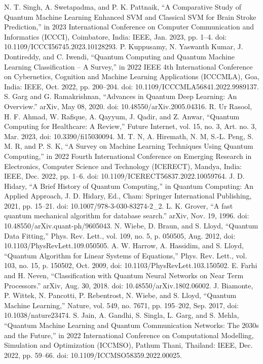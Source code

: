 \documentclass[conference]{IEEEtran}
\begin{document}
\begin{thebibliography}{00}
 N. T. Singh, A. Swetapadma, and P. K. Pattnaik, “A Comparative Study of Quantum Machine Learning Enhanced SVM and Classical SVM for Brain Stroke Prediction,” in 2023 International Conference on Computer Communication and Informatics (ICCCI), Coimbatore, India: IEEE, Jan. 2023, pp. 1–4. doi: 10.1109/ICCCI56745.2023.10128293.
 P. Kuppusamy, N. Yaswanth Kumar, J. Dontireddy, and C. Iwendi, “Quantum Computing and Quantum Machine Learning Classification – A Survey,” in 2022 IEEE 4th International Conference on Cybernetics, Cognition and Machine Learning Applications (ICCCMLA), Goa, India: IEEE, Oct. 2022, pp. 200–204. doi: 10.1109/ICCCMLA56841.2022.9989137.
 S. Garg and G. Ramakrishnan, “Advances in Quantum Deep Learning: An Overview.” arXiv, May 08, 2020. doi: 10.48550/arXiv.2005.04316.
 R. Ur Rasool, H. F. Ahmad, W. Rafique, A. Qayyum, J. Qadir, and Z. Anwar, “Quantum Computing for Healthcare: A Review,” Future Internet, vol. 15, no. 3, Art. no. 3, Mar. 2023, doi: 10.3390/fi15030094.
 M. T. N, A. Hiremath, N. M, S.-L. Peng, S. M. R, and P. S. K, “A Survey on Machine Learning Techniques Using Quantum Computing,” in 2022 Fourth International Conference on Emerging Research in Electronics, Computer Science and Technology (ICERECT), Mandya, India: IEEE, Dec. 2022, pp. 1–6. doi: 10.1109/ICERECT56837.2022.10059764.
 J. D. Hidary, “A Brief History of Quantum Computing,” in Quantum Computing: An Applied Approach, J. D. Hidary, Ed., Cham: Springer International Publishing, 2021, pp. 15–21. doi: 10.1007/978-3-030-83274-2\_2.
 L. K. Grover, “A fast quantum mechanical algorithm for database search.” arXiv, Nov. 19, 1996. doi: 10.48550/arXiv.quant-ph/9605043.
 N. Wiebe, D. Braun, and S. Lloyd, “Quantum Data Fitting,” Phys. Rev. Lett., vol. 109, no. 5, p. 050505, Aug. 2012, doi: 10.1103/PhysRevLett.109.050505.
 A. W. Harrow, A. Hassidim, and S. Lloyd, “Quantum Algorithm for Linear Systems of Equations,” Phys. Rev. Lett., vol. 103, no. 15, p. 150502, Oct. 2009, doi: 10.1103/PhysRevLett.103.150502.
 E. Farhi and H. Neven, “Classification with Quantum Neural Networks on Near Term Processors.” arXiv, Aug. 30, 2018. doi: 10.48550/arXiv.1802.06002.
 J. Biamonte, P. Wittek, N. Pancotti, P. Rebentrost, N. Wiebe, and S. Lloyd, “Quantum Machine Learning,” Nature, vol. 549, no. 7671, pp. 195–202, Sep. 2017, doi: 10.1038/nature23474.
 S. Jain, A. Gandhi, S. Singla, L. Garg, and S. Mehla, “Quantum Machine Learning and Quantum Communication Networks: The 2030s and the Future,” in 2022 International Conference on Computational Modelling, Simulation and Optimization (ICCMSO), Pathum Thani, Thailand: IEEE, Dec. 2022, pp. 59–66. doi: 10.1109/ICCMSO58359.2022.00025.

\end{thebibliography}
\end{document}
